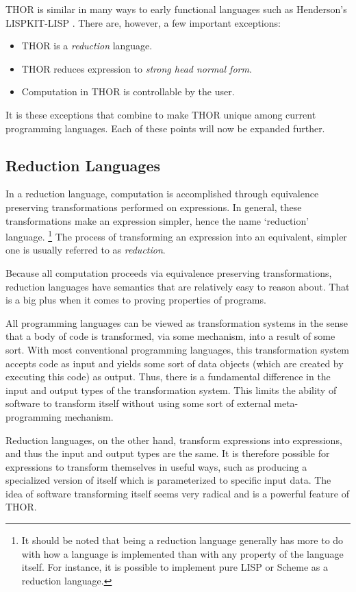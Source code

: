 	THOR is similar in many ways to early functional languages such as 
Henderson's LISPKIT-LISP \cite{henderson}.  There are, however, 
a few important exceptions:
\begin{itemize}
	\item THOR is a {\em reduction\/} language.
	\item THOR reduces expression to {\em strong head normal form\/}.
	\item Computation in THOR is controllable by the user.
\end{itemize}
It is these exceptions that combine to make THOR unique among current
programming languages.  Each of these points will now be expanded
further.


\subsection{Reduction Languages}

	In a reduction language, computation is accomplished through
equivalence preserving transformations performed on expressions. 
In general, these transformations make an expression simpler,
hence the name `reduction' language.  
	\footnote{It should be noted that being a reduction language
	generally has more to do with how a language is implemented
	than with any property of the language itself.  For
	instance, it is possible to implement pure LISP or Scheme as
	a reduction language.}
The process of transforming an expression into an equivalent,
simpler one is usually referred to as {\em reduction\/}.

	Because all computation proceeds via equivalence preserving
transformations, reduction languages have
semantics that are relatively easy to reason about.  That is
a big plus when it comes to proving properties of programs.  

	All programming languages can be viewed as transformation
systems in the sense that a body of code is transformed, via some
mechanism, into a result of some sort.  With most conventional
programming languages, this transformation system accepts code as
input and yields some sort of data objects (which are created by
executing this code) as output.  Thus,
there is a fundamental difference in the input and output types
of the transformation system.  This limits the ability of
software to transform itself without using some sort of external
meta-programming mechanism.

	Reduction languages, on the other hand, transform
expressions into expressions, and thus the input and output types
are the same.  It is therefore possible for expressions to
transform themselves in useful ways, such as producing a
specialized version of itself which is parameterized to specific
input data.  The idea of software transforming itself seems very
radical and is a powerful feature of THOR.



